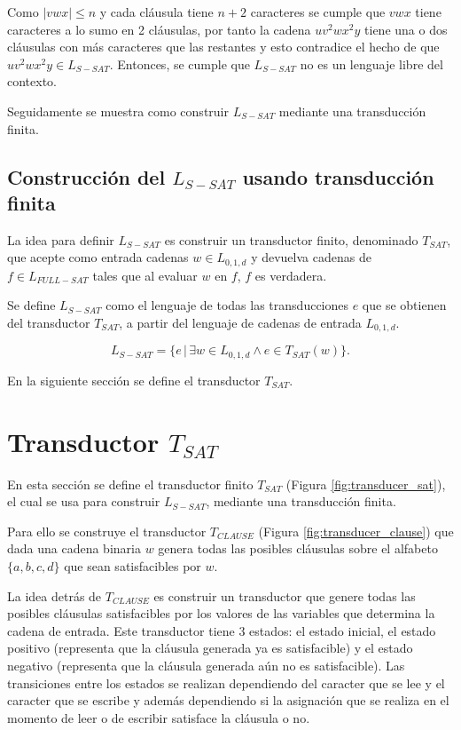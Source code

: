 Como $|vwx|\leq n$ y cada cláusula tiene $n+2$ caracteres se cumple que $vwx$ tiene caracteres a lo sumo en 2 cláusulas,
por tanto la cadena $uv^2wx^2y$ tiene una o dos cláusulas con más caracteres que las restantes y esto contradice el hecho
de que $uv^2wx^2y\in L_{S-SAT}$. Entonces, se cumple que $L_{S-SAT}$ no es un lenguaje libre del contexto.

Seguidamente se muestra como construir $L_{S-SAT}$ mediante una transducción finita.

\subsection{Construcción del $L_{S-SAT}$ usando transducción finita}

La idea para definir $L_{S-SAT}$ es construir un transductor finito, denominado $T_{SAT}$, que acepte como
entrada cadenas $w\in L_{0,1,d}$ y devuelva cadenas de $f\in L_{FULL-SAT}$ tales que al evaluar $w$ en $f$, $f$
es verdadera.

Se define $L_{S-SAT}$ como el lenguaje de todas las transducciones $e$ que se obtienen del transductor
$T_{SAT}$, a partir del lenguaje de cadenas de entrada $L_{0,1,d}$.

$$L_{S-SAT} = \{e\,|\,\exists w \in L_{0,1,d} \wedge e \in T_{SAT}(w) \}.$$

En la siguiente sección se define el transductor $T_{SAT}$.

\section{Transductor $T_{SAT}$}
\label{sec:tsat}

En esta sección se define el transductor finito $T_{SAT}$ (Figura \ref{fig:transducer_sat}), el cual se usa para construir $L_{S-SAT}$, mediante
una transducción finita.

Para ello se construye el transductor $T_{CLAUSE}$ (Figura \ref{fig:transducer_clause}) que dada una cadena binaria $w$
genera todas las posibles cláusulas sobre el alfabeto $\{a,b,c,d\}$ que sean satisfacibles por $w$.

La idea detrás de $T_{CLAUSE}$ es construir un transductor que genere todas las posibles cláusulas satisfacibles
por los valores de las variables que determina la cadena de entrada. Este transductor tiene 3 estados: el
estado inicial, el estado positivo (representa que la cláusula generada ya es satisfacible) y el estado
negativo (representa que la cláusula generada aún no es satisfacible). Las transiciones entre los estados
se realizan dependiendo del caracter que se lee y el caracter que se escribe y además dependiendo si la asignación
que se realiza en el momento de leer o de escribir satisface la cláusula o no.

